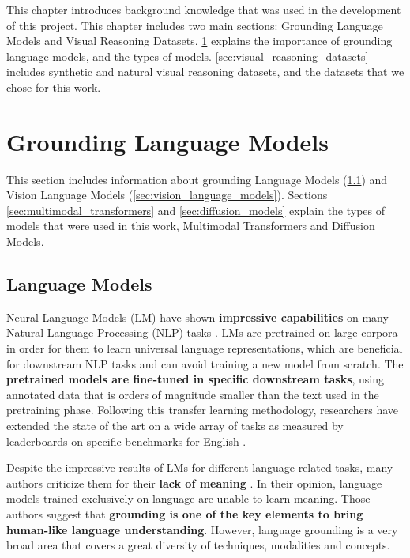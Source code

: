 This chapter introduces background knowledge that was used in the development of this project. This chapter includes two main sections: Grounding Language Models and Visual Reasoning Datasets. \cref{sec:grounding_language_models} explains the importance of grounding language models, and the types of models. \cref{sec:visual_reasoning_datasets} includes synthetic and natural visual reasoning datasets, and the datasets that we chose for this work.

\section{Grounding Language Models} \label{sec:grounding_language_models}

This section includes information about grounding Language Models (\ref{sec:language_models}) and Vision Language Models (\ref{sec:vision_language_models}). Sections \ref{sec:multimodal_transformers} and \ref{sec:diffusion_models} explain the types of models that were used in this work, Multimodal Transformers and Diffusion Models.

\subsection{Language Models} \label{sec:language_models}

Neural Language Models (LM) have shown \textbf{impressive capabilities} on many Natural Language Processing (NLP) tasks \cite{wang2019superglue, brown2020language, chowdhery2022palm}. LMs are pretrained on large corpora in order for them to learn universal language representations, which are beneficial for downstream NLP tasks and can avoid training a new model from scratch. The \textbf{pretrained models are fine-tuned in specific downstream tasks}, using annotated data that is orders of magnitude smaller than the text used in the pretraining phase. Following this transfer learning methodology, researchers have extended the state of the art on a wide array of tasks as measured by leaderboards on specific benchmarks for English \cite{bommasani2021opportunities, wang2019superglue}.

Despite the impressive results of LMs for different language-related tasks, many authors criticize them for their \textbf{lack of meaning} \cite{bender2020climbing, bender2021dangers}. In their opinion, language models trained exclusively on language are unable to learn meaning. Those authors suggest that \textbf{grounding is one of the key elements to bring human-like language understanding}. However, language grounding is a very broad area that covers a great diversity of techniques, modalities and concepts. 

